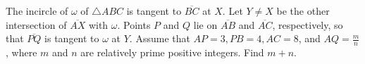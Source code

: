 The incircle of $\omega$ of $\triangle ABC$ is tangent to $\overline{BC}$ at $X$. Let $Y \neq X$ be the other intersection of $\overline{AX}$ with $\omega$. Points $P$ and $Q$ lie on  $\overline{AB}$ and $\overline{AC}$,  respectively, so that $\overline{PQ}$ is tangent to $\omega$ at $Y$. Assume that $AP=3, PB = 4, AC=8$,  and $AQ = \tfrac{m}{n}$,  where  $m$ and $n$ are relatively prime positive integers. Find $m+n$.